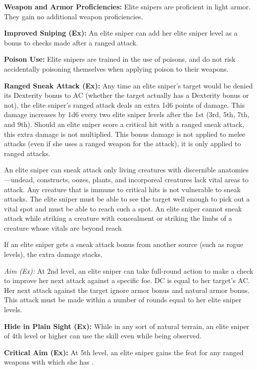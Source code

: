 {
\textbf{Weapon and Armor Proficiencies:} Elite snipers are proficient in light armor. They gain no additional weapon proficiencies.

\textbf{Improved Sniping (Ex):} An elite sniper can add her elite sniper level as a bonus to  checks made after a ranged attack.

\textbf{Poison Use:} Elite snipers are trained in the use of poisons, and do not risk accidentally poisoning themselves when applying poison to their weapons.

\textbf{Ranged Sneak Attack (Ex):} Any time an elite sniper's target would be denied its Dexterity bonus to AC (whether the target actually has a Dexterity bonus or not), the elite sniper's ranged attack deals an extra 1d6 points of damage. This damage increases by 1d6 every two elite sniper levels after the 1st (3rd, 5th, 7th, and 9th). Should an elite sniper score a critical hit with a ranged sneak attack, this extra damage is not multiplied. This bonus damage is not applied to melee attacks (even if she uses a ranged weapon for the attack), it is only applied to ranged attacks.

An elite sniper can sneak attack only living creatures with discernible anatomies---undead, constructs, oozes, plants, and incorporeal creatures lack vital areas to attack. Any creature that is immune to critical hits is not vulnerable to sneak attacks. The elite sniper must be able to see the target well enough to pick out a vital spot and must be able to reach such a spot. An elite sniper cannot sneak attack while striking a creature with concealment or striking the limbs of a creature whose vitals are beyond reach\

If an elite sniper gets a sneak attack bonus from another source (such as rogue levels), the extra damage stacks.

\textit{Aim (Ex):} At 2nd level, an elite sniper can take full-round action to make a  check to improve her next attack against a specific foe. DC is equal to her target's AC. Her next attack against the target ignore armor bonus and natural armor bonus. This attack must be made within a number of rounds equal to \onehalf her elite sniper levels.

\textbf{Hide in Plain Sight (Ex):} While in any sort of natural terrain, an elite sniper of 4th level or higher can use the  skill even while being observed.

\textbf{Critical Aim (Ex):} At 5th level, an elite sniper gains the  feat for any ranged weapons with which she has .

}
